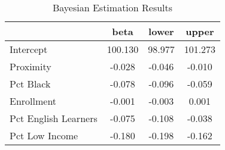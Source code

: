 \begin{table}[h]
\centering
\caption{Bayesian Estimation Results} 
\begin{tabular}{|l|c|c|c|}
  \hline
 & beta & lower & upper \\ 
  \hline
Intercept & 100.130 & 98.977 & 101.273 \\ 
   \hline
Proximity & -0.028 & -0.046 & -0.010 \\ 
   \hline
Pct Black & -0.078 & -0.096 & -0.059 \\ 
   \hline
Enrollment & -0.001 & -0.003 & 0.001 \\ 
   \hline
Pct English Learners & -0.075 & -0.108 & -0.038 \\ 
   \hline
Pct Low Income & -0.180 & -0.198 & -0.162 \\ 
   \hline
\end{tabular}
\end{table}
